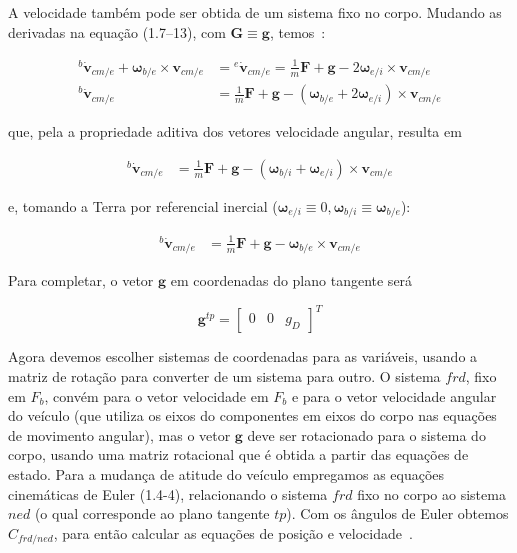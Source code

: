A velocidade também pode ser obtida de um sistema fixo no corpo. Mudando as derivadas na equação (1.7--13), com \(\mathbf{G} \equiv \mathbf{g}\), temos~\cite{Stevens2016}:

\begin{align*}\tag{1.7-16a}
   {^{b}{\dot{\mathbf{v}}}_{cm/e}} + \mathbf{\omega}_{b/e} \times \mathbf{v}_{cm/e} &= {^{e}{\dot{\mathbf{v}}_{cm/e}}} = \textstyle{\frac{1}{m}}\mathbf{F} + \mathbf{g} - 2 \mathbf{\omega}_{e/i} \times \mathbf{v}_{cm/e} \\
   {^{b}{\dot{\mathbf{v}}_{cm/e}}} &= \textstyle{\frac{1}{m}} \mathbf{F} + \mathbf{g} - \left( \mathbf{\omega}_{b/e} + 2 {\mathbf{\omega}_{e/i}} \right) \times \mathbf{v}_{cm/e}
\end{align*}

que, pela a propriedade aditiva dos vetores velocidade angular, resulta em

\begin{align*}\tag{1.7-16b}
    {^{b}{\dot{\mathbf{v}}_{cm/e}}} &= \textstyle{\frac{1}{m}} \mathbf{F} + \mathbf{g} - {\left( \mathbf{\omega}_{b/i} + \mathbf{\omega}_{e/i} \right)} \times \mathbf{v}_{cm/e}
\end{align*}

e, tomando a Terra por referencial inercial (\(\mathbf{\omega}_{e/i} \equiv 0 , \mathbf{\omega}_{b/i} \equiv \mathbf{\omega}_{b/e}\)):

\begin{align*}\tag{1.7-16c}
   {^{b}{\dot{\mathbf{v}}_{cm/e}}} &= \textstyle{\frac{1}{m}} \mathbf{F} + \mathbf{g} - \mathbf{\omega}_{b/e} \times \mathbf{v}_{cm/e}
\end{align*}

Para completar, o vetor \(\mathbf{g}\) em coordenadas do plano tangente será\footnotemark{}

\begin{equation*}
\mathbf{g}^{tp} = {\begin{bmatrix} 0 & 0& g_{D} \end{bmatrix}}^{T}
\end{equation*}

Agora devemos escolher sistemas de coordenadas para as variáveis, usando a matriz de rotação para converter de um sistema para outro. O sistema \(frd\), fixo em \(F_{b}\), convém para o vetor velocidade em \(F_{b}\) e para o vetor velocidade angular do veículo (que utiliza os eixos do componentes em eixos do corpo nas equações de movimento angular), mas o vetor \(\mathbf{g}\)  deve ser rotacionado para o sistema do corpo, usando uma matriz rotacional que é obtida a partir das equações de estado. Para a mudança de atitude do veículo empregamos as equações cinemáticas de Euler (1.4-4), relacionando o sistema \(frd\) fixo no corpo ao sistema \(ned\) (o qual  corresponde ao plano tangente \(tp\)). Com os ângulos de Euler obtemos \(C_{frd/ned}\), para então calcular as equações de posição e velocidade~\cite{Stevens2016}.

